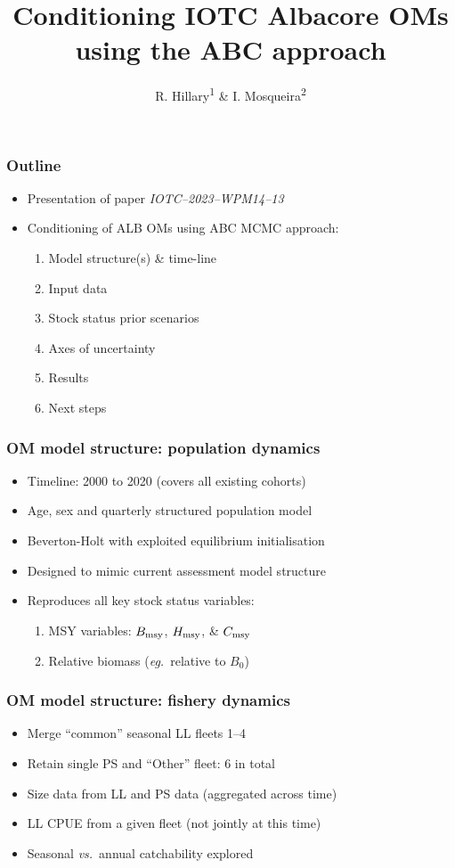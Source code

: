 \documentclass{beamer}
\title{Conditioning IOTC Albacore OMs using the ABC approach}
\author{R. Hillary\textsuperscript{1} \& I. Mosqueira\textsuperscript{2}}
\institute{\textsuperscript{1}CSIRO Environment \& \textsuperscript{2}University of Wageningen}
\newcommand{\bmsy}{B_{\rm msy}}
\newcommand{\cmsy}{C_{\rm msy}}
\newcommand{\hmsy}{H_{\rm msy}}
\newcommand{\vs}{\textit{vs.}~}
\newcommand{\eg}{\textit{eg.}~}
\begin{document}
\maketitle
\begin{frame}
\frametitle{Outline}
\begin{itemize}
    \item Presentation of paper \textit{IOTC--2023--WPM14--13}
    \item Conditioning of ALB OMs using ABC MCMC approach:
        \vspace{0.25cm} 
        \begin{enumerate}
            \item Model structure(s) \& time-line
            \item Input data
            \item Stock status prior scenarios
            \item Axes of uncertainty
            \item Results
            \item Next steps
        \end{enumerate}
\end{itemize}
\end{frame}
\begin{frame}
\frametitle{OM model structure: population dynamics}
\begin{itemize}
    \item Timeline: 2000 to 2020 (covers all existing cohorts)
    \item Age, sex and quarterly structured population model
    \item Beverton-Holt with exploited equilibrium initialisation
    \item Designed to mimic current assessment model structure
    \item Reproduces all key stock status variables:
        \vspace{0.25cm}
        \begin{enumerate}
            \item MSY variables: $\bmsy$, $\hmsy$, \& $\cmsy$
            \item Relative biomass (\eg relative to $B_0$)
        \end{enumerate}
\end{itemize}
\end{frame}
\begin{frame}
\frametitle{OM model structure: fishery dynamics}
\begin{itemize}
    \item Merge ``common'' seasonal LL fleets 1--4
    \item Retain single PS and ``Other'' fleet: 6 in total
    \item Size data from LL and PS data (aggregated across time)
    \item LL CPUE from a given fleet (not jointly at this time)
    \item Seasonal \vs annual catchability explored
\end{itemize}
\end{frame}
\end{document}
